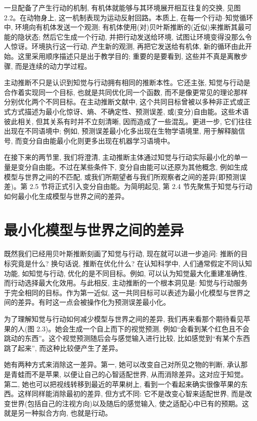 一旦配备了产生行动的机制, 有机体就能够与其环境展开相互往复的交换, 见图 2.2。在动物身上, 这一机制表现为运动反射回路。本质上, 在每一个行动--知觉循环中, 环境向有机体发送一个观测; 有机体使用(对)贝叶斯推断的(近似)来推断其最可能的隐状态; 然后它生成一个行动, 并把行动发送给环境, 试图让环境变得没那么令人惊讶。环境执行这一行动, 产生新的观测, 再把它发送给有机体, 新的循环由此开始。这里采用顺序描述只是出于教学目的; 重要的是要看到, 这些并不真是离散步骤, 而是连续的动力学过程。

主动推断不只是认识到知觉与行动拥有相同的推断本性。它还主张, 知觉与行动是合作着实现同一个目标, 也就是共同优化同一个函数, 而不是像更常见的理论那样分别优化两个不同目标。在主动推断文献中, 这个共同目标曾被以多种非正式或正式方式描述为最小化惊讶、熵、不确定性、预测误差, 或(变分)自由能。这些术语彼此相关, 但其关系有时并不立刻清晰, 因而造成了一些混乱。更进一步, 它们往往出现在不同语境中; 例如, 预测误差最小化多出现在生物学语境里, 用于解释脑信号, 而变分自由能最小化则更多出现在机器学习语境中。

在接下来的两节里, 我们将澄清, 主动推断主体通过知觉与行动实际最小化的单一量是变分自由能。不过在某些条件下, 变分自由能可以还原为其他概念, 例如生成模型与世界之间的不匹配, 或我们所期望者与我们所观察者之间的差异(即预测误差)。第 2.5 节将正式引入变分自由能。为简明起见, 第 2.4 节先聚焦于知觉与行动如何最小化生成模型与世界之间的差异。

\section{最小化模型与世界之间的差异}

既然我们已经用贝叶斯推断刻画了知觉与行动, 现在就可以进一步追问: 推断的目标究竟是什么? 换句话说, 推断在优化什么? 在认知科学中, 人们通常假定不同认知功能, 如知觉与行动, 优化的是不同目标。例如, 可以认为知觉最大化重建准确性, 而行动选择最大化效用。与此相反, 主动推断的一个根本洞见是: 知觉与行动服务于完全相同的目标。作为第一近似, 这一共同目标可以表述为最小化模型与世界之间的差异。有时这一点会被操作化为预测误差最小化。

为了理解知觉与行动如何减少模型与世界之间的差异, 我们再来看那个期待看见苹果的人(图 2.3)。她会生成一个自上而下的视觉预测, 例如``会看到某个红色且不会跳动的东西''。这个视觉预测随后会与感觉输入进行比较, 比如感觉到``有某个东西跳了起来'', 而这种比较便产生了差异。

她有两种方式来消除这一差异。第一, 她可以改变自己对所见之物的判断, 承认那是青蛙而不是苹果, 以便让自己的心智适配世界, 从而消除差异。这对应于知觉。第二, 她也可以把视线转移到最近的苹果树上, 看到一个看起来确实很像苹果的东西。这样同样能消除最初的差异, 但方式不同: 它不是改变心智来适配世界, 而是改变世界(包括自己的注视方向)以及随后的感觉输入, 使之适配心中已有的预期。这就是另一种拟合方向, 也就是行动。

